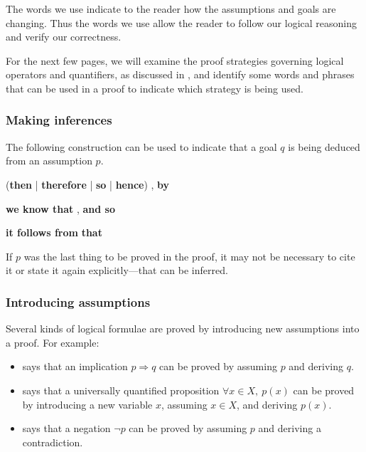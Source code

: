 The words we use indicate to the reader how the assumptions and goals are changing. Thus the words we use allow the reader to follow our logical reasoning and verify our correctness.

For the next few pages, we will examine the proof strategies governing logical operators and quantifiers, as discussed in , and identify some words and phrases that can be used in a proof to indicate which strategy is being used.


\subsubsection*{Making inferences}

\begin{vocabulary}
\label{vcbBy}
The following construction can be used to indicate that a goal $q$ is being deduced from an assumption $p$.

\begin{vocabtemplate}
(\textbf{then} | \textbf{therefore} | \textbf{so} | \textbf{hence}) , \textbf{by} 

\vtor

\textbf{we know that} , \textbf{and so} 

\vtor

\textbf{it follows from}  \textbf{that} 
\end{vocabtemplate}

If $p$ was the last thing to be proved in the proof, it may not be necessary to cite it or state it again explicitly---that can be inferred.
\end{vocabulary}


\subsubsection*{Introducing assumptions}

Several kinds of logical formulae are proved by introducing new assumptions into a proof. For example:
\begin{itemize}
\item {} says that an implication $p \Rightarrow q$ can be proved by assuming $p$ and deriving $q$.
\item {} says that a universally quantified proposition $\forall x \in X,~ p(x)$ can be proved by introducing a new variable $x$, assuming $x \in X$, and deriving $p(x)$.
\item {} says that a negation $\neg p$ can be proved by assuming $p$ and deriving a contradiction.
\end{itemize}

